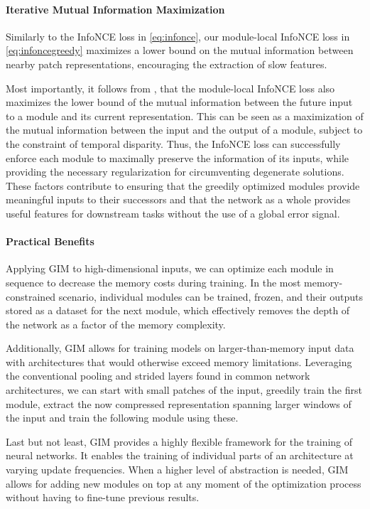 \documentclass{article}
\begin{document}
\paragraph{Iterative Mutual Information Maximization}

Similarly to the InfoNCE loss in \cref{eq:infonce}, our module-local InfoNCE loss in \cref{eq:infoncegreedy} maximizes a lower bound on the mutual information  between nearby patch representations, encouraging the extraction of slow features. 


Most importantly, it follows from \citet{oord2018representation}, that the module-local InfoNCE loss also maximizes the lower bound of the mutual information  between the future input to a module and its current representation. This can be seen as a maximization of the mutual information between the input and the output of a module, subject to the constraint of temporal disparity. Thus, the InfoNCE loss can successfully enforce each module to maximally preserve the information of its inputs, while providing the necessary regularization \citep{krause2010discriminative,hu2017learning} for circumventing degenerate solutions. These factors contribute to ensuring that the greedily optimized modules provide meaningful inputs to their successors and that the network as a whole provides useful features for downstream tasks without the use of a global error signal. 

\paragraph{Practical Benefits}
Applying GIM to high-dimensional inputs, we can optimize each module in sequence to decrease the memory costs during training. In the most memory-constrained scenario, individual modules can be trained, frozen, and their outputs stored as a dataset for the next module, which effectively removes the depth of the network as a factor of the memory complexity.

Additionally, GIM allows for training models on larger-than-memory input data with architectures that would otherwise exceed memory limitations. Leveraging the conventional pooling and strided layers found in common network architectures, we can start with small patches of the input, greedily train the first module, extract the now compressed representation spanning larger windows of the input and train the following module using these.

Last but not least, GIM provides a highly flexible framework for the training of neural networks. It enables the training of individual parts of an architecture at varying update frequencies. When a higher level of abstraction is needed, GIM allows for adding new modules on top at any moment of the optimization process without having to fine-tune previous results.
\end{document}
